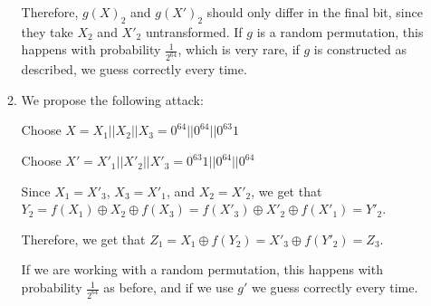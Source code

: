 \begin{enumerate}[label=(\alph*)]
\begin{enumerate}[label=(\roman*)]
        Therefore, $g(X)_2$ and $g(X')_2$ should only differ in the final bit, since they take $X_2$ and $X'_2$ untransformed. If $g$ is a random permutation, this happens with probability $\frac{1}{2^{64}}$, which is very rare, if $g$ is constructed as described, we guess correctly every time.

      \item

        We propose the following attack:

        Choose $X = X_1||X_2||X_3 = 0^{64}||0^{64}||0^{63}1$

        Choose $X' = X'_1||X'_2||X'_3 = 0^{63}1||0^{64}||0^{64}$

        Since $X_1 = X'_3$, $X_3 = X'_1$, and $X_2 = X'_2$, we get that $Y_2 = f(X_1) \oplus X_2 \oplus f(X_3) = f(X'_3) \oplus X'_2 \oplus f(X'_1) = Y'_2$.

        Therefore, we get that $Z_1 = X_1 \oplus f(Y_2) = X'_3 \oplus f(Y'_2) = Z_3$.

        If we are working with a random permutation, this happens with probability $\frac{1}{2^{64}}$ as before, and if we use $g'$ we guess correctly every time.
        
    \end{enumerate}
        
\end{enumerate}


